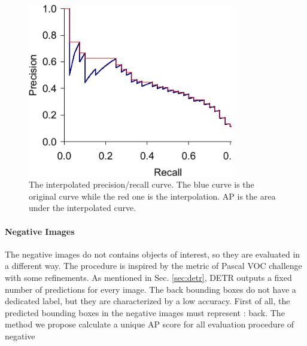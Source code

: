 \begin{figure}[h!]
	\centering
	\includegraphics[width=0.8\textwidth]{images/interpolated.png}
	\caption{The interpolated precision/recall curve. The blue curve is the original curve while the red one is the interpolation. AP is the area under the interpolated curve.}
	\label{fig:interpolation}
\end{figure}

\paragraph{Negative Images} The negative images do not contains objects of interest, so they are evaluated in a different way. The procedure is inspired by the metric of Pascal VOC challenge \cite{pascal} with some refinements. As mentioned in Sec. \ref{sec:detr}, DETR outputs a fixed number of predictions for every image. The back bounding boxes do not have a dedicated label, but they are characterized by a low accuracy. First of all, the predicted bounding boxes in the negative images must represent : back. The method we propose calculate a unique AP score for all  evaluation procedure of negative 




